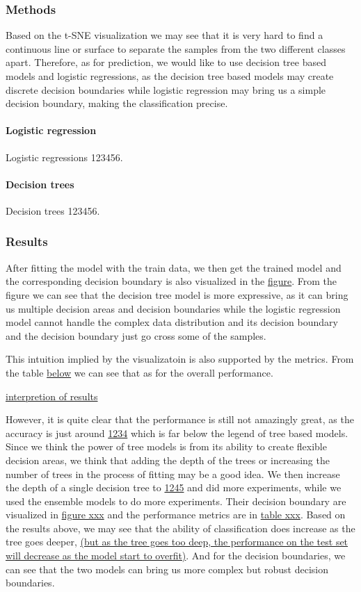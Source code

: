 \documentclass{article}
\begin{document}
\subsubsection*{Methods}

Based on the t-SNE visualization we may see that it is very hard to find a continuous line or surface to separate the samples from the two different classes apart. 
Therefore, as for prediction, we would like to use decision tree based models and logistic regressions, as the decision tree based models may create discrete decision boundaries while logistic regression may bring us a simple decision boundary, making the classification precise.

\paragraph{Logistic regression} Logistic regressions 123456.

\paragraph{Decision trees} Decision trees 123456.

\subsubsection*{Results}




After fitting the model with the train data, we then get the trained model and the corresponding decision boundary is also visualized in the \underline{figure}. From the figure we can see that the decision tree model is more expressive, as it can bring us multiple decision areas and decision boundaries while the logistic regression model cannot handle the complex data distribution and its decision boundary and the decision boundary just go cross some of the samples. 


This intuition implied by the visualizatoin is also supported by the metrics. From the table \underline{below} we can see that as for the overall performance. 

\underline{interpretion of results}


However, it is quite clear that the performance is still not amazingly great, as the accuracy is just around \underline{1234} which is far below the legend of tree based models. Since we think the power of tree models is from its ability to create flexible decision areas, we think that adding the depth of the trees or increasing the number of trees in the process of fitting may be a good idea. We then increase the depth of a single decision tree to \underline{1245} and did more experiments,
while we used the ensemble models to do more experiments. Their decision boundary are visualized in \underline{figure xxx} and the performance metrics are in \underline{table xxx}. Based on the results above, we may see that the ability of classification does increase as the tree goes deeper, 
\underline{(but as the tree goes too deep, the performance on the test set will decrease as the model start to overfit)}. 
And for the decision boundaries, we can see that the two models can bring us more complex but robust decision boundaries.
\end{document}
